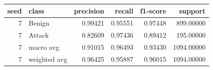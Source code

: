 \begin{tabular}{rlrrrr}
\toprule
seed & class & precision & recall & f1-score & support \\
\midrule
7 & Benign & 0.99421 & 0.95551 & 0.97448 & 899.00000 \\
7 & Attack & 0.82609 & 0.97436 & 0.89412 & 195.00000 \\
7 & macro avg & 0.91015 & 0.96493 & 0.93430 & 1094.00000 \\
7 & weighted avg & 0.96425 & 0.95887 & 0.96015 & 1094.00000 \\
\bottomrule
\end{tabular}
